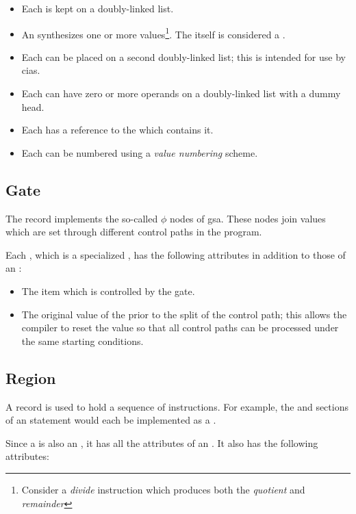 \begin{itemize}
\item Each is kept on a doubly-linked list.
\item An synthesizes one or more 
  values\footnote{Consider a \emph{divide} instruction which produces
    both the \emph{quotient} and \emph{remainder}}.  The
   itself is considered a .
\item Each can be placed on a second doubly-linked list; this is
  intended for use by \acp{cia}.
\item Each can have zero or more operands on a doubly-linked list with
  a dummy head.
\item Each has a reference to the  which contains it.
  \item Each can be numbered using a \emph{value numbering} scheme. 
\end{itemize}

\subsection{Gate}
The  record implements the so-called $\phi$ nodes of
\ac{gsa}.  These nodes join values which are set through different
control paths in the program.

Each , which is a specialized , has the
following attributes in addition to those of an :

\begin{itemize}
\item The  item which is controlled by the gate.
\item The original value of the  prior to the split
  of the control path; this allows the compiler to reset the value so
  that all control paths can be processed under the same starting conditions.
\end{itemize}

\subsection{Region}

A  record is used to hold a sequence of instructions.
For example, the  and  sections of an 
statement would each be implemented as a .

Since a  is also an , it has all the
attributes of an .  It also has the following
attributes:

